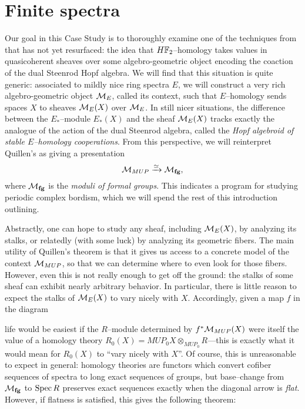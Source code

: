 
\chapter{Finite spectra}\label{ChapterFiniteSpectra}



Our goal in this Case Study is to thoroughly examine one of the techniques from  that has not yet resurfaced: the idea that $\HFtwo$--homology takes values in quasicoherent sheaves over some algebro-geometric object encoding the coaction of the dual Steenrod Hopf algebra.  We will find that this situation is quite generic: associated to mildly nice ring spectra $E$, we will construct a very rich algebro-geometric object $\mathcal{M}_{E}$, called its context, such that $E$--homology sends spaces $X$ to sheaves $\mathcal{M}_{E}(X)$ over $\mathcal{M}_{E}$.  In still nicer situations, the difference between the $E_*$--module $E_*(X)$ and the sheaf $\mathcal{M}_{E}(X)$ tracks exactly the analogue of the action of the dual Steenrod algebra, called the \textit{Hopf algebroid of stable $E$--homology cooperations}.  From this perspective, we will reinterpret Quillen's  as giving a presentation \[\mathcal{M}_{MUP} \xrightarrow{\simeq} \mathcal{M}_{\mathbf{fg}},\] where $\mathcal{M}_{\mathbf{fg}}$ is the \textit{moduli of formal groups}.  This indicates a program for studying periodic complex bordism, which we will spend the rest of this introduction outlining.

Abstractly, one can hope to study any sheaf, including $\mathcal{M}_{E}(X)$, by analyzing its stalks, or relatedly (with some luck) by analyzing its geometric fibers.  The main utility of Quillen's theorem is that it gives us access to a concrete model of the context $\mathcal{M}_{MUP}$, so that we can determine where to even look for those fibers.  However, even this is not really enough to get off the ground: the stalks of some sheaf can exhibit nearly arbitrary behavior.  In particular, there is little reason to expect the stalks of $\mathcal{M}_{E}(X)$ to vary nicely with $X$.  Accordingly, given a map $f$ in the diagram
\begin{center}
\end{center}
life would be easiest if the $R$--module determined by $f^* \mathcal{M}_{MUP}(X)$ were itself the value of a homology theory $R_0(X) = MUP_0 X \otimes_{MUP_0} R$---this is exactly what it would mean for $R_0(X)$ to ``vary nicely with $X$''.  Of course, this is unreasonable to expect in general: homology theories are functors which convert cofiber sequences of spectra to long exact sequences of groups, but base--change from $\mathcal{M}_{\mathbf{fg}}$ to $\operatorname{Spec} R$ preserves exact sequences exactly when the diagonal arrow is \textit{flat}.  However, if flatness is satisfied, this gives the following theorem:


